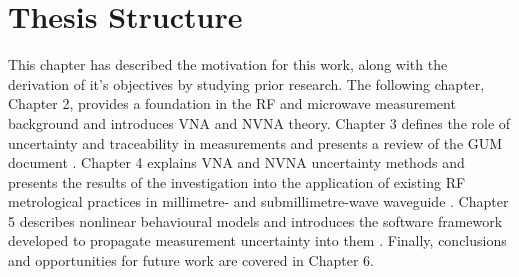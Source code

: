 \documentclass[../thesis/thesis.tex]{subfiles}
\begin{document}
\section{Thesis Structure}
This chapter has described the motivation for this work, along with the derivation of it's objectives by studying prior research. The following chapter, Chapter 2, provides a foundation in the RF and microwave measurement background and introduces VNA and NVNA theory. Chapter 3 defines the role of uncertainty and traceability in measurements and presents a review of the GUM document \cite{Stant_2016}. Chapter 4 explains VNA and NVNA uncertainty methods and presents the results of the investigation into the application of existing RF metrological practices in millimetre- and submillimetre-wave waveguide \cite{Stant_2017}. Chapter 5 describes nonlinear behavioural models and introduces the software framework developed to propagate measurement uncertainty into them \cite{Stant_2018_TMTT}. Finally, conclusions and opportunities for future work are covered in Chapter 6.

\end{document}
